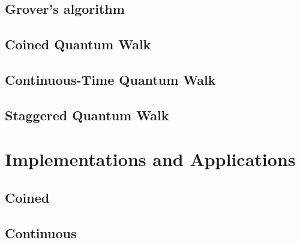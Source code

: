 \documentclass[
oneside,
11pt, a4paper,
footinclude=true,
headinclude=true,
cleardoublepage=empty
]{scrbook}
\begin{document}
\section{Grover's algorithm}\label{sec:GrovSearchSimul}

\section{Coined Quantum Walk}\label{sec:CoinedSearchSimul}

\section{Continuous-Time Quantum Walk}\label{sec:ContSearchSimul}

\section{Staggered Quantum Walk}\label{sec:StagSearchSimul}


\chapter{Implementations and Applications}\label{chap:qiskitImplementation}
\section{Coined}\label{coinedQWQiskit}

\section{Continuous}

\end{document}
